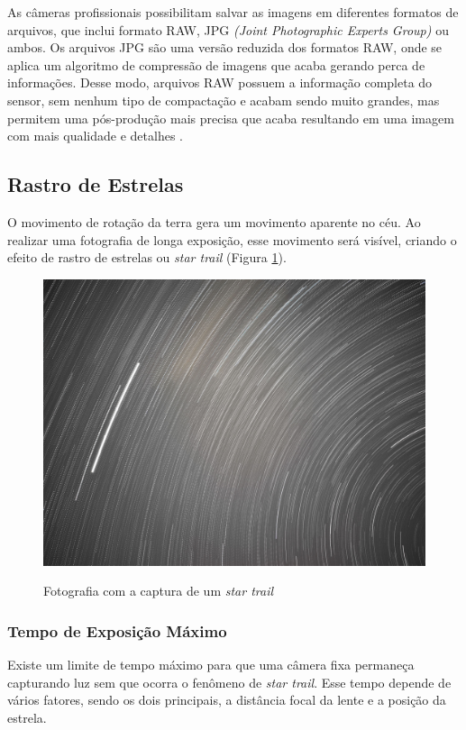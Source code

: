 As câmeras profissionais possibilitam salvar as imagens em diferentes formatos de arquivos, que inclui formato RAW, JPG \textit{(Joint Photographic Experts Group)} ou ambos. Os arquivos JPG são uma versão reduzida dos formatos RAW, onde se aplica um algoritmo de compressão de imagens que acaba gerando perca de informações. Desse modo, arquivos RAW possuem a informação completa do sensor, sem nenhum tipo de compactação e acabam sendo muito grandes, mas permitem uma pós-produção mais precisa que acaba resultando em uma imagem com mais qualidade e detalhes \cite{book:bbcsky}.

\subsection{Rastro de Estrelas}

O movimento de rotação da terra gera um movimento aparente no céu. Ao realizar uma fotografia de longa exposição, esse movimento será visível, criando o efeito de rastro de estrelas ou \textit{star trail} (Figura \ref{fig:startrail_example}).

\begin{figure}[!htb]
	\centering
	\caption{Fotografia com a captura de um \textit{star trail}}
	\includegraphics[width=0.7\linewidth]{figuras/revisaobiblio/startrail_example}
	\label{fig:startrail_example}
\end{figure}

\subsubsection{Tempo de Exposição Máximo}
\label{sec:TempoMax}

Existe um limite de tempo máximo para que uma câmera fixa permaneça capturando luz sem que ocorra o fenômeno de \textit{star trail}. Esse tempo depende de vários fatores, sendo os dois principais, a distância focal da lente e a posição da estrela.

